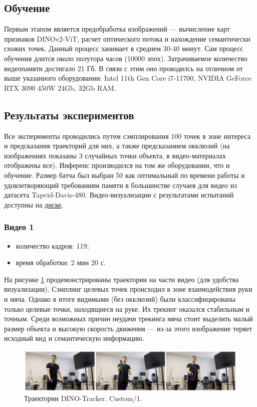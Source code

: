 \documentclass[a4paper, 14pt]{extarticle}
\theoremstyle{definition}
\theoremstyle{plain}
\theoremstyle{remark}
\begin{document}
\subsection{Обучение}

Первым этапом является предобработка изображений --- вычисление карт признаков DINOv2-ViT, расчет оптического потока и нахождение семантически схожих точек. Данный процесс занимает в среднем 30-40 минут. Сам процесс обучения длится около полутора часов (10000 эпох).
Затрачиваемое количество видеопамяти достигало 21 Гб. В связи с этим оно проводилсь на отличном от выше указанного оборудовании: Intel 11th Gen Core i7-11700, NVIDIA GeForce RTX 3090 450W 24Gb, 32Gb RAM.

\subsection{Результаты экспериментов}
Все эксперименты проводились путем сэмплирования 100 точек в зоне интереса и предсказания траекторий для них, а также предсказанием окклюзий (на изображениях показаны 3 случайных точки объекта, в видео-материалах отображены все). Инференс производился на том же оборудовании, что и обучение. Размер батча был выбран 50 как оптимальный по времени работы и удовлетворяющий требованиям памяти в большинстве случаев для видео из датасета Tapvid-Davis-480. Видео-визуализации с результатами испытаний доступны на \href{https://drive.google.com/drive/folders/1jyuXTmpgYpkRt16hLX30Lu-oDO__paxN?usp=drive_link}{диске}.

\subsubsection{Видео 1}
\begin{itemize}
	\item количество кадров: 119;
	\item время обработки: 2 мин 20 с.
\end{itemize}

На рисунке \ref{fig:custom-1} продемонстрированы траектории на части видео (для удобства визуализации). Сэмплинг целевых точек происходил в зоне взаимодействия руки и мяча. Однако в итоге видимыми (без окклюзий) были классифицированы только целевые точки, находящиеся на руке. Их трекинг оказался стабильным и точным. Среди возможных причин неудачи трекинга мяча стоит выделить малый размер объекта и высокую скорость движения --- из-за этого изображение теряет исходный вид и семантическую информацию. 
\begin{figure}
    [H]
    \centering
    \includegraphics[width=\textwidth]{figs/custom-1.png}
    \caption{Траектории DINO-Tracker. Custom/1.}
    \label{fig:custom-1}
\end{figure}
\end{document}
